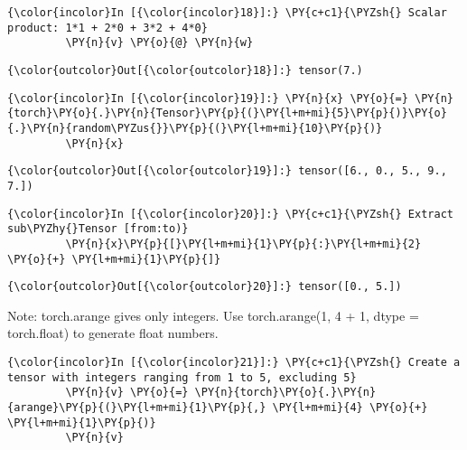 \begin{Verbatim}[commandchars=\\\{\}]
{\color{incolor}In [{\color{incolor}18}]:} \PY{c+c1}{\PYZsh{} Scalar product: 1*1 + 2*0 + 3*2 + 4*0}
         \PY{n}{v} \PY{o}{@} \PY{n}{w} 
\end{Verbatim}


\begin{Verbatim}[commandchars=\\\{\}]
{\color{outcolor}Out[{\color{outcolor}18}]:} tensor(7.)
\end{Verbatim}
            
\begin{Verbatim}[commandchars=\\\{\}]
{\color{incolor}In [{\color{incolor}19}]:} \PY{n}{x} \PY{o}{=} \PY{n}{torch}\PY{o}{.}\PY{n}{Tensor}\PY{p}{(}\PY{l+m+mi}{5}\PY{p}{)}\PY{o}{.}\PY{n}{random\PYZus{}}\PY{p}{(}\PY{l+m+mi}{10}\PY{p}{)}
         \PY{n}{x}
\end{Verbatim}


\begin{Verbatim}[commandchars=\\\{\}]
{\color{outcolor}Out[{\color{outcolor}19}]:} tensor([6., 0., 5., 9., 7.])
\end{Verbatim}
            
   

\begin{Verbatim}[commandchars=\\\{\}]
{\color{incolor}In [{\color{incolor}20}]:} \PY{c+c1}{\PYZsh{} Extract sub\PYZhy{}Tensor [from:to)}
         \PY{n}{x}\PY{p}{[}\PY{l+m+mi}{1}\PY{p}{:}\PY{l+m+mi}{2} \PY{o}{+} \PY{l+m+mi}{1}\PY{p}{]} 
\end{Verbatim}


\begin{Verbatim}[commandchars=\\\{\}]
{\color{outcolor}Out[{\color{outcolor}20}]:} tensor([0., 5.])
\end{Verbatim}
       
Note: torch.arange gives only integers. Use torch.arange(1, 4 + 1, dtype = torch.float) to generate float numbers.      
            
\begin{Verbatim}[commandchars=\\\{\}]
{\color{incolor}In [{\color{incolor}21}]:} \PY{c+c1}{\PYZsh{} Create a tensor with integers ranging from 1 to 5, excluding 5}
         \PY{n}{v} \PY{o}{=} \PY{n}{torch}\PY{o}{.}\PY{n}{arange}\PY{p}{(}\PY{l+m+mi}{1}\PY{p}{,} \PY{l+m+mi}{4} \PY{o}{+} \PY{l+m+mi}{1}\PY{p}{)} 
         \PY{n}{v} 
\end{Verbatim}


